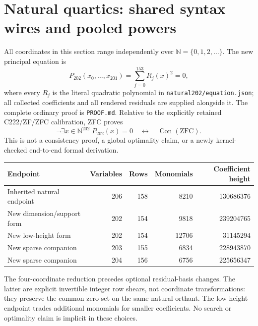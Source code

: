 \section{Natural quartics: shared syntax wires and pooled powers}
\label{sec:natural21}

All coordinates in this section range independently over
$\mathbb N=\{0,1,2,\ldots\}$. The new principal equation is
\[
 P_{202}(x_0,\ldots,x_{201})=\sum_{j=0}^{153}R_j(x)^2=0,
\]
where every $R_j$ is the literal quadratic polynomial in
\texttt{natural202/equation.json}; all collected coefficients and all
rendered residuals are supplied alongside it. The complete ordinary proof
is \texttt{PROOF.md}. Relative to the explicitly retained C222/ZF/ZFC
calibration, ZFC proves
\[
 \neg\exists x\in\mathbb N^{202}\;P_{202}(x)=0
 \quad\longleftrightarrow\quad\operatorname{Con}(\mathrm{ZFC}).
\]
This is not a consistency proof, a global optimality claim, or a newly
kernel-checked end-to-end formal derivation.

\begin{center}
\begin{tabular}{lrrrr}
\hline
Endpoint & Variables & Rows & Monomials & Coefficient height\\
\hline
Inherited natural endpoint &206&158&8210&130686376\\
New dimension/support form &202&154&9818&239204765\\
New low-height form &202&154&12706&31145294\\
New sparse companion &203&155&6834&228943870\\
New sparse companion &204&156&6756&225656347\\
\hline
\end{tabular}
\end{center}

The four-coordinate reduction precedes optional residual-basis changes.
The latter are explicit invertible integer row shears, not coordinate
transformations: they preserve the common zero set on the same natural
orthant. The low-height endpoint trades additional monomials for smaller
coefficients. No search or optimality claim is implicit in these choices.

